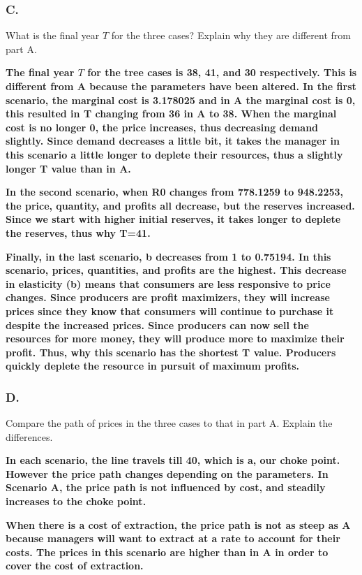 \documentclass[
]{article}
\begin{document}
\hypertarget{c.}{%
\subsubsection{C.}\label{c.}}

What is the final year \(T\) for the three cases? Explain why they are
different from part A.

{\textbf{The final year \(T\) for the tree cases is 38, 41, and 30
respectively. This is different from A because the parameters have been
altered. In the first scenario, the marginal cost is 3.178025 and in A
the marginal cost is 0, this resulted in T changing from 36 in A to 38.
When the marginal cost is no longer 0, the price increases, thus
decreasing demand slightly. Since demand decreases a little bit, it
takes the manager in this scenario a little longer to deplete their
resources, thus a slightly longer T value than in A.}}

{\textbf{In the second scenario, when R0 changes from 778.1259 to
948.2253, the price, quantity, and profits all decrease, but the
reserves increased. Since we start with higher initial reserves, it
takes longer to deplete the reserves, thus why T=41.}}

{ \textbf{Finally, in the last scenario, b decreases from 1 to 0.75194.
In this scenario, prices, quantities, and profits are the highest. This
decrease in elasticity (b) means that consumers are less responsive to
price changes. Since producers are profit maximizers, they will increase
prices since they know that consumers will continue to purchase it
despite the increased prices. Since producers can now sell the resources
for more money, they will produce more to maximize their profit. Thus,
why this scenario has the shortest T value. Producers quickly deplete
the resource in pursuit of maximum profits.}}

\hypertarget{d.}{%
\subsubsection{D.}\label{d.}}

Compare the path of prices in the three cases to that in part A. Explain
the differences.

{\textbf{In each scenario, the line travels till 40, which is a, our
choke point. However the price path changes depending on the parameters.
In Scenario A, the price path is not influenced by cost, and steadily
increases to the choke point.}}

{\textbf{When there is a cost of extraction, the price path is not as
steep as A because managers will want to extract at a rate to account
for their costs. The prices in this scenario are higher than in A in
order to cover the cost of extraction.}}
\end{document}
